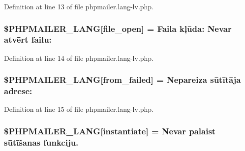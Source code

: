 Definition at line 13 of file phpmailer.\+lang-\/lv.\+php.

\subsubsection[{\texorpdfstring{\$\+P\+H\+P\+M\+A\+I\+L\+E\+R\+\_\+\+L\+A\+NG}{$PHPMAILER_LANG}}]{\setlength{\rightskip}{0pt plus 5cm}\$P\+H\+P\+M\+A\+I\+L\+E\+R\+\_\+\+L\+A\+NG\mbox{[}\textquotesingle{}file\+\_\+open\textquotesingle{}\mbox{]} = \textquotesingle{}Faila kļūda\+: Nevar atvērt failu\+: \textquotesingle{}}\hypertarget{phpmailer_8lang-lv_8php_a28d1a6517bf4c942a0ddd506188ad2e0}{}\label{phpmailer_8lang-lv_8php_a28d1a6517bf4c942a0ddd506188ad2e0}


Definition at line 14 of file phpmailer.\+lang-\/lv.\+php.

\subsubsection[{\texorpdfstring{\$\+P\+H\+P\+M\+A\+I\+L\+E\+R\+\_\+\+L\+A\+NG}{$PHPMAILER_LANG}}]{\setlength{\rightskip}{0pt plus 5cm}\$P\+H\+P\+M\+A\+I\+L\+E\+R\+\_\+\+L\+A\+NG\mbox{[}\textquotesingle{}from\+\_\+failed\textquotesingle{}\mbox{]} = \textquotesingle{}Nepareiza sūtītāja adrese\+: \textquotesingle{}}\hypertarget{phpmailer_8lang-lv_8php_adf832ae12155a09be077c6d5e4fd7e22}{}\label{phpmailer_8lang-lv_8php_adf832ae12155a09be077c6d5e4fd7e22}


Definition at line 15 of file phpmailer.\+lang-\/lv.\+php.

\subsubsection[{\texorpdfstring{\$\+P\+H\+P\+M\+A\+I\+L\+E\+R\+\_\+\+L\+A\+NG}{$PHPMAILER_LANG}}]{\setlength{\rightskip}{0pt plus 5cm}\$P\+H\+P\+M\+A\+I\+L\+E\+R\+\_\+\+L\+A\+NG\mbox{[}\textquotesingle{}instantiate\textquotesingle{}\mbox{]} = \textquotesingle{}Nevar palaist sūtīšanas funkciju.\textquotesingle{}}\hypertarget{phpmailer_8lang-lv_8php_ad58dde16780f4770ccf4dd282ea1f5ad}{}\label{phpmailer_8lang-lv_8php_ad58dde16780f4770ccf4dd282ea1f5ad}


